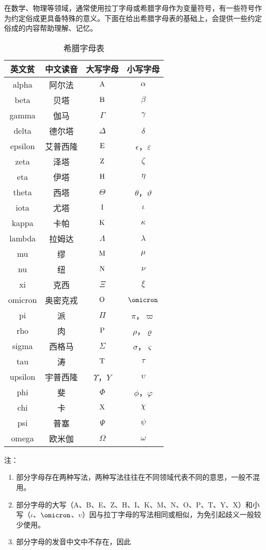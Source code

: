 \begin{issues}
\issueDraft
\end{issues}
在数学、物理等领域，通常使用拉丁字母或希腊字母作为变量符号，有一些符号作为约定俗成更具备特殊的意义。下面在给出希腊字母表的基础上，会提供一些约定俗成的内容帮助理解、记忆。

\begin{table}[ht]
\centering
\caption{希腊字母表}\label{tab_GreekL1}
\begin{tabular}{|c|c|c|c|}
\hline
英文贫 & 中文读音 & 大写字母 & 小写字母 \\
\hline
alpha & 阿尔法 & ${\rm A}$ & $\alpha$ \\
\hline
beta & 贝塔 & ${\rm B}$ & $\beta$ \\
\hline
gamma & 伽马 & $\Gamma$ & $\gamma$ \\
\hline
delta & 德尔塔 &$\Delta$ & $\delta$ \\
\hline
epsilon & 艾普西隆 & ${\rm E}$ & $\epsilon$，$\varepsilon$ \\
\hline
zeta & 泽塔 & ${\rm Z}$ & $\zeta$ \\
\hline
eta & 伊塔 & ${\rm H}$ & $\eta$ \\
\hline
theta & 西塔 & $\Theta$ & $\theta$，$\vartheta$ \\
\hline
iota & 尤塔 & ${\rm I}$ & $\iota$ \\
\hline
kappa & 卡帕 & ${\rm K}$ & $\kappa$ \\
\hline
lambda & 拉姆达 &$\Lambda$ & $\lambda$ \\
\hline
mu & 缪 & ${\rm M}$ & $\mu$ \\
\hline
nu & 纽 & ${\rm N}$ & $\nu$ \\
\hline
xi & 克西 &$\Xi$ & $\xi$ \\
\hline
omicron & 奥密克戎 & ${\rm O}$ & $\omicron$ \\
\hline
pi & 派 &$\Pi$ & $\pi$，$\varpi$ \\
\hline
rho & 肉 & ${\rm P}$ & $\rho$，$\varrho$ \\
\hline
sigma & 西格马 &$\Sigma$ & $\sigma$，$\varsigma$ \\
\hline
tau & 涛 & ${\rm T}$ & $\tau$ \\
\hline
upsilon & 宇普西隆 & $\Upsilon$，${Y}$ & $\upsilon$ \\
\hline
phi & 斐 &$\Phi$ & $\phi$，$\varphi$ \\
\hline
chi & 卡 & ${\rm X}$ & $\chi$ \\
\hline
psi & 普塞 & $\Psi$ & $\psi$ \\
\hline
omega & 欧米伽 & $\Omega$ & $\omega$ \\
\hline
\end{tabular}
\end{table}

注：
\begin{enumerate}
\item 部分字母存在两种写法，两种写法往往在不同领域代表不同的意思，一般不混用。
\item 部分字母的大写（A、B、E、Z、H、I、K、M、N、O、P、T、Y、X）和小写（$\iota$、$\omicron$、$\upsilon$）因与拉丁字母的写法相同或相似，为免引起歧义一般较少使用。
\item 部分字母的发音中文中不存在，因此
\end{enumerate}


